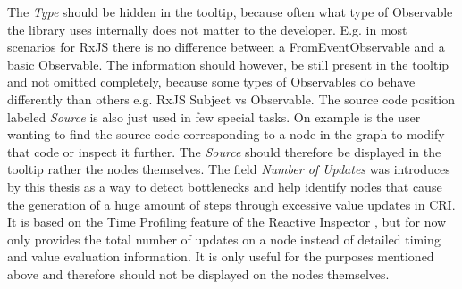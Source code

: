 The \emph{Type} should be hidden in the tooltip, because often what type of Observable the library uses internally does not matter to the developer. E.g. in most scenarios for RxJS there is no difference between a FromEventObservable and a basic Observable. The information should however, be still present in the tooltip and not omitted completely, because some types of Observables do behave differently than others e.g. RxJS Subject vs Observable. The source code position labeled \emph{Source} is also just used in few special tasks. On example is the user wanting to find the source code corresponding to a node in the graph to modify that code or inspect it further. The \emph{Source} should therefore be displayed in the tooltip rather the nodes themselves. The field \emph{Number of Updates} was introduces by this thesis as a way to detect bottlenecks and help identify nodes that cause the generation of a huge amount of steps through excessive value updates in CRI. It is based on the Time Profiling feature of the Reactive Inspector \cite{ReactiveInspector}, but for now only provides the total number of updates on a node instead of detailed timing and value evaluation information. It is only useful for the purposes mentioned above and therefore should not be displayed on the nodes themselves.

